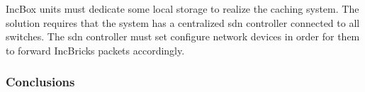 IncBox units must dedicate some local storage to realize the caching system.
The solution requires that the system has a centralized \gls{sdn} controller connected to all switches.
The \gls{sdn} controller must set configure network devices in order for them to forward IncBricks \cite{incbricks} packets accordingly.

\subsubsection{Conclusions}